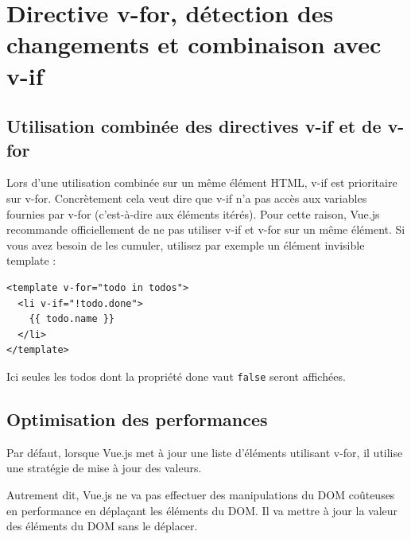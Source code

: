 \documentclass{article}
\begin{document}


\section{Directive v-for, détection des changements et combinaison avec v-if}
\subsection{Utilisation combinée des directives {\color{monOrange}v-if} et de {\color{monOrange}v-for}}
Lors d'une utilisation combinée sur un même élément HTML, {\color{monOrange}v-if} est prioritaire sur {\color{monOrange}v-for}. Concrètement cela veut dire que {\color{monOrange}v-if} n'a pas accès aux variables fournies par {\color{monOrange}v-for} (c'est-à-dire aux éléments itérés). Pour cette raison, {\color{monOrange}Vue.js} recommande officiellement de ne pas utiliser {\color{monOrange}v-if} et {\color{monOrange}v-for} sur un même élément. Si vous avez besoin de les cumuler, utilisez par exemple un élément invisible {\color{monOrange}template} :
\begin{verbatim}
<template v-for="todo in todos">
  <li v-if="!todo.done">
    {{ todo.name }}
  </li>
</template>
\end{verbatim}
Ici seules les {\color{monOrange}todos} dont la propriété {\color{monOrange}done} vaut {\tt false} seront affichées.

\subsection{Optimisation des performances}
Par défaut, lorsque {\color{monOrange}Vue.js} met à jour une liste d'éléments utilisant {\color{monOrange}v-for}, il utilise une stratégie de mise à jour des valeurs.

Autrement dit, {\color{monOrange}Vue.js} ne va pas effectuer des manipulations du DOM coûteuses en performance en déplaçant les éléments du DOM. Il va mettre à jour la valeur des éléments du DOM sans le déplacer.
\end{document}
